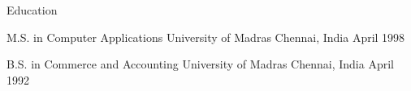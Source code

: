 \cvsection
  {Education}
\begin{cventries}

  \cventry
    {M.S. in Computer Applications} %
    {University of Madras} %
    {Chennai, India} %
    {April 1998} %
    {}
    

  \cventry
	{B.S. in Commerce and Accounting} %
	{University of Madras} %
	{Chennai, India} %
	{April 1992} %
	{}

\end{cventries}
